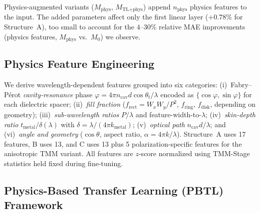 \documentclass[a4paper,fleqn]{cas-sc}
\newcommand{\Mzero}{M_0}
\newcommand{\Mphys}{M_\text{phys}}
\newcommand{\Mtlphys}{M_\text{TL+phys}}
\begin{document}
Physics-augmented variants ($\Mphys$, $\Mtlphys$) append $n_\text{phys}$ physics features to the input. The added parameters affect only the first linear layer ($+0.78\%$ for Structure~A), too small to account for the $4$--$30\%$ relative MAE improvements (physics features, $\Mphys$ vs.\ $\Mzero$) we observe.


\subsection{Physics Feature Engineering}
\label{sec:features}

We derive wavelength-dependent features grouped into six categories: (i)~Fabry--P\'{e}rot \emph{cavity-resonance} phase $\varphi = 4\pi n_\text{cav}d\cos\theta_t/\lambda$ encoded as $\{\cos\varphi,\sin\varphi\}$ for each dielectric spacer; (ii)~\emph{fill fraction} ($f_\text{rect}{=}W_xW_y/P^2$, $f_\text{ring}$, $f_\text{disk}$, depending on geometry); (iii)~\emph{sub-wavelength ratios} $P/\lambda$ and feature-width-to-$\lambda$; (iv)~\emph{skin-depth ratio} $t_\text{metal}/\delta(\lambda)$ with $\delta = \lambda/(4\pi k_\text{metal})$; (v)~\emph{optical path} $n_\text{cav}d/\lambda$; and (vi)~\emph{angle and geometry} ($\cos\theta$, aspect ratio, $\alpha=4\pi k/\lambda$). Structure~A uses 17 features, B uses 13, and C uses 13 plus 5 polarization-specific features for the anisotropic TMM variant. All features are $z$-score normalized using TMM-Stage statistics held fixed during fine-tuning.


\subsection{Physics-Based Transfer Learning (PBTL) Framework}
\label{sec:pbtl}
\end{document}
